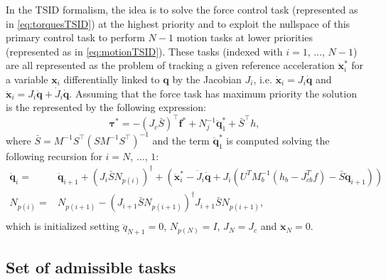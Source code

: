 \documentclass[12pt,a4paper,twoside]{article}
\begin{document}
In the TSID formalism, the idea is to solve the force control task (represented as in \eqref{eq:torquesTSID}) at the highest priority and to exploit the nullspace of this primary control task to perform $N-1$ motion tasks at lower priorities (represented as in \eqref{eq:motionTSID}). These tasks (indexed with $i = 1$, $\dots$, $N-1$) are all represented as the problem of tracking a given reference acceleration $\ddot {\bm x}_i^*$ for a variable ${\bm x}_i$ differentially linked to $\bm q$ by the Jacobian $J_i$, i.e. $\dot {\bm x}_i = J_i \dot {\bm q}$ and $\ddot {\bm x}_i = J_i \ddot {\bm q} + \dot J_i \dot {\bm q} $. Assuming that the force task has maximum priority the solution is the represented by the following expression:
\begin{equation}
\bm \tau^{*} = -(J_c\bar{S})^\top \bm f^* + N_j^{-1} {\ddot{\bm q}}_1^* + \bar{S}^\top h,
\end{equation}
where $\bar S = M^{-1} S^\top \left( S M^{-1} S^\top \right)^{-1}$ and the term ${\ddot{\bm q}}_1^*$ is computed solving the following recursion for $i =N$, $\dots$, $1$:
\begin{equation} 
\begin{split}
\ddot{\bm  q}_i =& \ddot{\bm q}_{i+1} + (J_i \bar{S} N_{p(i)})^\dagger+ (\ddot{\bm x}_i^*-\dot{J}_i\dot{\bm q} + J_i (U^T M_b^{-1}(h_b-J_{cb}^T f) - \bar{S} \ddot{\bm q}_{i+1}))\\
N_{p(i)} =& N_{p(i+1)} - (J_{i+1} \bar{S} N_{p(i+1)})^\dagger J_{i+1} \bar{S} N_{p(i+1)}, \\
\end{split}
\end{equation}
which is initialized setting $\ddot{q}_{N+1} = 0$, \mbox{$N_{p(N)}=I$}, $J_N = J_c$ and $\ddot{ \bm x}_N = 0$.

\subsection{Set of admissible tasks} \label{sec:tasks}
\end{document}
